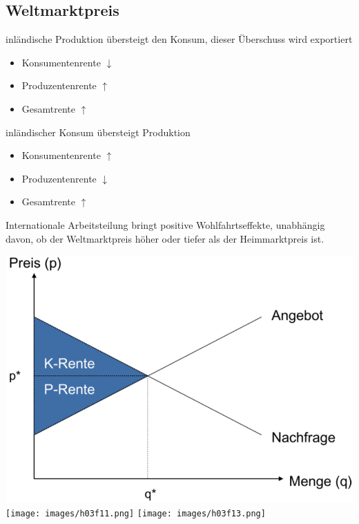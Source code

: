 \subsection{Weltmarktpreis}
\begin{description}
	\item[Hoher Weltmarktpreis] inländische Produktion übersteigt den Konsum, dieser Überschuss wird exportiert
	\begin{itemize}
		\item Konsumentenrente $\downarrow$
		\item Produzentenrente $\uparrow$
		\item Gesamtrente $\uparrow$
	\end{itemize}
	\item[Tiefer Weltmarktpreis] inländischer Konsum übersteigt Produktion
	\begin{itemize}
		\item Konsumentenrente $\uparrow$
		\item Produzentenrente $\downarrow$
		\item Gesamtrente $\uparrow$
	\end{itemize}
	\item Internationale Arbeitsteilung bringt positive Wohlfahrtseffekte, unabhängig davon, ob der Weltmarktpreis höher oder tiefer als der Heimmarktpreis ist.
\end{description}
\begin{multicols}{3}
	\includegraphics[width=\linewidth]{images/rente.png}
	\columnbreak
	\texttt{[image: images/h03f11.png]}
	\columnbreak
	\texttt{[image: images/h03f13.png]}
\end{multicols}

